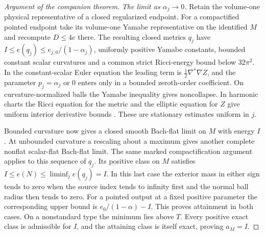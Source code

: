 \begin{proof}[Argument of the companion theorem]
\emph{The limit as \(\alpha_j\to0\).}
Retain the volume-one physical representative of a closed regularized
endpoint. For a compactified pointed endpoint take its volume-one
Yamabe representative on the identified \(M\) and recompute
\(D\le4e\) there. The resulting closed metrics \(q_j\) have
\(I\le e(q_j)\le e_{j,0}/(1-\alpha_j)\), uniformly positive Yamabe
constants, bounded constant scalar curvatures and a common strict
Ricci-energy bound below \(32\pi^2\). In the constant-scalar Euler
equation the leading term is \(\tfrac12\nabla^*\nabla Z\), and the
parameter \(p_j=\alpha_j\) or \(0\) enters only in a bounded zeroth-order
coefficient. On curvature-normalized balls the Yamabe inequality gives
noncollapse. In harmonic charts the Ricci equation for the metric and
the elliptic equation for \(Z\) give uniform interior derivative bounds
\cite[The limit of critical metrics]{Baker2026BourAttainment}. These are
stationary estimates uniform in \(j\).

Bounded curvature now gives a closed smooth Bach-flat limit on \(M\)
with energy \(I\). At unbounded curvature a rescaling about a maximum
gives another complete nonflat scalar-flat Bach-flat limit. The same
marked compactification argument applies to this sequence of \(q_j\).
Its positive class on \(M\) satisfies
\(I\le e(N)\le\liminf_j e(q_j)=I\). In this last case the exterior mass in either sign tends to zero when the source index tends to infinity first and the normal ball radius then tends to zero. For a pointed output at a fixed positive parameter the corresponding upper bound is \(e_0/(1-\alpha)-I\). This proves attainment in both
cases. On a nonstandard type the minimum lies above \(T\). Every positive
exact class is admissible for \(I\), and the attaining class is itself
exact, proving \(a_M=I\).
\end{proof}

